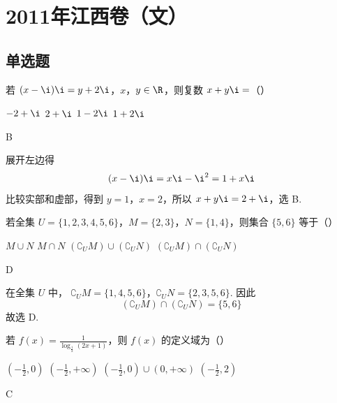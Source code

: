 \chapter{2011年江西卷（文）}

\section{单选题}

\begin{problem}
若 \((x - \i)\i = y + 2\i\)，\(x\)，\(y \in \R\)，则复数 \(x + y\i =\)（\quad）

\choices
    {\(-2 + \i\)}
    {\(2 + \i\)}
    {\(1 - 2\i\)}
    {\(1 + 2\i\)}
\end{problem}

\begin{answer}
B
\end{answer}

\begin{solution}
展开左边得
\[
(x-\i)\i=x\i-\i^2=1+x\i
\]
比较实部和虚部，得到 \(y=1\)，\(x=2\)，所以 \(x+y\i=2+\i\)，选 B.
\end{solution}

\begin{problem}
若全集 \(U = \{1, 2, 3, 4, 5, 6\}\)，\(M = \{2, 3\}\)，\(N = \{1, 4\}\)，则集合 \(\{5, 6\}\) 等于（\quad）

\choices
    {\(M \cup N\)}
    {\(M \cap N\)}
    {\((\complement_U M) \cup (\complement_U N)\)}
    {\((\complement_U M) \cap (\complement_U N)\)}
\end{problem}

\begin{answer}
D
\end{answer}

\begin{solution}
在全集 \(U\) 中，
\(\complement_U M=\{1,4,5,6\}\)，\(\complement_U N=\{2,3,5,6\}\).
因此
\[
(\complement_U M)\cap(\complement_U N)=\{5,6\}
\]
故选 D.
\end{solution}

\begin{problem}
若 \( f(x) = \frac{1}{\log_{\frac{1}{2}}(2x + 1)} \)，则 \( f(x) \) 的定义域为（\quad）

\choices
    {\(\left(-\frac{1}{2}, 0\right)\)}
    {\(\left(-\frac{1}{2}, +\infty\right)\)}
    {\(\left(-\frac{1}{2}, 0\right) \cup (0, +\infty)\)}
    {\(\left(-\frac{1}{2}, 2\right)\)}
\end{problem}

\begin{answer}
C
\end{answer}

